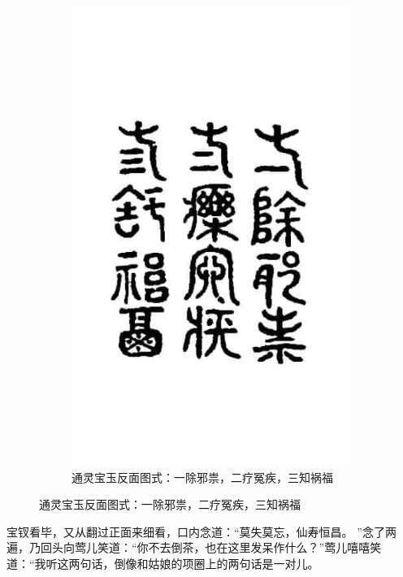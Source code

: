 \begin{figure}[h]
\begin{subfigure}[b]{0.45\textwidth}
         \includegraphics[width=\textwidth]{images/yu-2.JPG}
         \caption*{通灵宝玉反面图式：一除邪祟，二疗冤疾，三知祸福}%
     \end{subfigure}
\end{figure}
宝钗看毕，又从翻过正面来细看，口内念道：“莫失莫忘，仙寿恒昌。
”念了两遍，乃回头向莺儿笑道：“你不去倒茶，也在这里发呆作什么？”莺儿嘻嘻笑道：“我听这两句话，倒像和姑娘的项圈上的两句话是一对儿。
